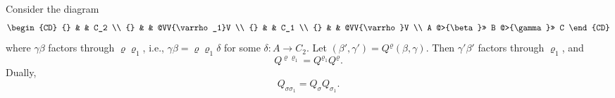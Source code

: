 \begin{proposition}[Proposition 4.3]
Consider the diagram
\[
\begin{CD}
{} &  & C_2 \\
{} &  & @VV{\varrho_1}V \\
{} &  & C_1 \\
{} &  & @VV{\varrho}V \\
A @>{\beta}>> B @>{\gamma}>> C
\end{CD}
\]
where $\gamma\beta$ factors through $\varrho\varrho_1$, i.e., $\gamma\beta = \varrho\varrho_1\delta$ for some $\delta : A \to C_2$. Let $(\beta', \gamma') = Q^{\varrho}(\beta, \gamma)$. Then $\gamma'\beta'$ factors through $\varrho_1$, and
\[
Q^{\varrho\varrho_1} = Q^{\varrho_1} Q^{\varrho}.
\tag{4.10}
\]
Dually,
\[
Q_{\sigma\sigma_1} = Q_{\sigma} Q_{\sigma_1}.
\tag{4.11}
\]
\end{proposition}

